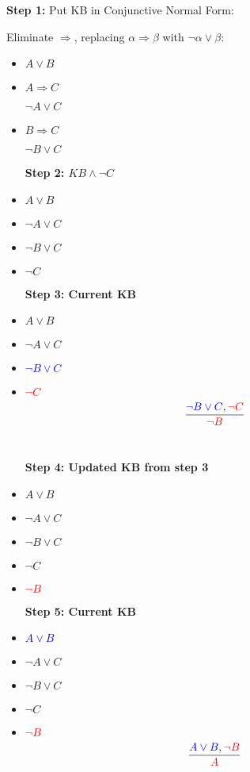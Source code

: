 \documentclass{article}
\begin{document}
\textbf{Step 1:} Put KB in Conjunctive Normal Form:\\
\par Eliminate $\Rightarrow$, replacing $\alpha \Rightarrow \beta$ with $\neg \alpha \lor \beta$:
\begin{itemize}
    \item $A \lor B$
    \item $A \Rightarrow C$
    \par $\neg A \lor C$
    \item $B \Rightarrow C$
    \par $\neg B \lor C$\\
    
    \par \textbf{Step 2: $KB \land \neg C$ }
    \item $A \lor B$
    \item $\neg A \lor C$
    \item $\neg B \lor C$
    \item $\neg C$
    \pagebreak
    
    \par \textbf{Step 3: Current KB}
    \item $A \lor B$
    \item $\neg A \lor C$
    \item {\textcolor{blue}{$\neg B \lor C$}}
    \item {\textcolor{red}{$\neg C$}}\newline
    \[\frac{\textcolor{blue}{\neg B \lor C}, \textcolor{red}{\neg C}}{\textcolor{red}{\neg B}}\]\\
    
    \par \textbf{Step 4: Updated KB from step 3}
    \item $A \lor B$
    \item $\neg A \lor C$
    \item $\neg B \lor C$
    \item $\neg C$
    \item \textcolor{red}{$\neg B$}\\
    
    \par \textbf{Step 5: Current KB}\\
    \item \textcolor{blue}{$A \lor B$}
    \item $\neg A \lor C$
    \item $\neg B \lor C$
    \item $\neg C$
    \item \textcolor{red}{$\neg B$}
    \[\frac{\textcolor{blue}{A \lor B}, \textcolor{red}{\neg B}}{\textcolor{red}{A}}\]\\
    \pagebreak
    

\end{itemize}
\end{document}

